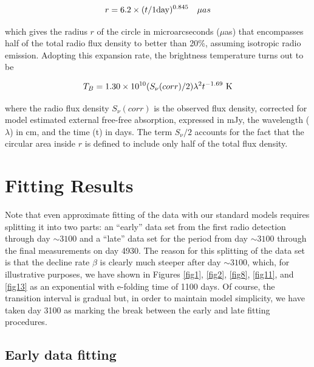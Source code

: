 \documentclass[12pt,preprint]{aastex}
\begin{document}
\begin{equation}
\label{eq12}
r = 6.2 \times (t/1 {\rm day})^{0.845} ~~~ \mu as
\end{equation}

\noindent which gives the radius $r$ of the circle in microarcseconds ($\mu$as) that encompasses half of
the total radio flux density to better than 20\%, assuming isotropic radio emission.  Adopting this
expansion rate, the brightness temperature turns out to be

\begin{equation}
\label{eq13}
T_B = 1.30\times10^{10} (S_\nu(corr)/2) \lambda^2 t^{-1.69} ~{\rm K}
\end{equation}

\noindent where the radio flux density $S_\nu(corr)$ is the observed flux density, corrected for model estimated external free-free absorption, expressed in mJy, the wavelength ($\lambda$) in cm,
and the time (t) in days.  The term $S_\nu/2$ accounts for the fact that the circular area inside
$r$ is defined to include only half of the total flux density.

\section{Fitting Results}

Note that even approximate fitting of the data with our standard models
requires splitting it into two parts: an ``early'' data set from the first radio detection 
through day $\sim3100$ and a ``late'' data set for the period from day $\sim3100$ through
the final measurements on day 4930. The reason for this splitting of the
data set is that the decline rate $\beta$ is clearly much steeper after day $\sim3100$, which, for illustrative purposes, we have shown in Figures \ref{fig1}, \ref{fig2}, \ref{fig8}, \ref{fig11}, and \ref{fig13} as an exponential with e-folding time of 1100 days. Of course, the transition interval is gradual but, in order to maintain model simplicity, we have taken day 3100 as marking the break between the early and late fitting procedures.

\subsection{Early data fitting}
\end{document}
